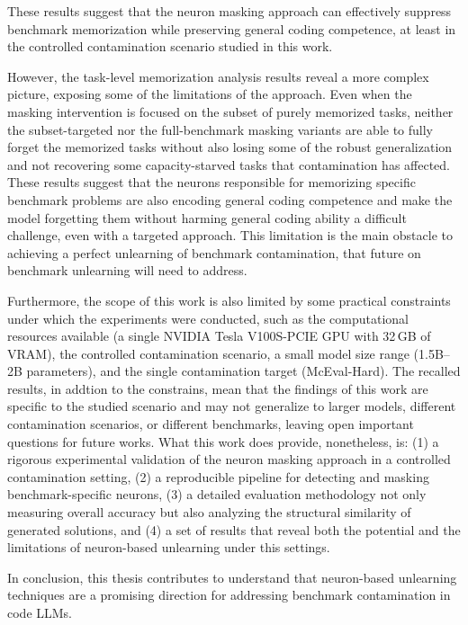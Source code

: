 \documentclass[mscthesis]{usiinfthesis}
\begin{document}
These results suggest that the neuron masking approach can effectively suppress benchmark memorization while preserving general coding competence, at least in the controlled contamination scenario studied in this work.
\par\vspace{1em}
However, the task-level memorization analysis results reveal a more complex picture, exposing some of the limitations of the approach.
Even when the masking intervention is focused on the subset of purely memorized tasks, neither the subset-targeted nor the full-benchmark masking variants are able to fully forget the memorized tasks without also losing some of the robust generalization and not recovering some capacity-starved tasks that contamination has affected.
These results suggest that the neurons responsible for memorizing specific benchmark problems are also encoding general coding competence and make the model forgetting them without harming general coding ability a difficult challenge, even with a targeted approach.
This limitation is the main obstacle to achieving a perfect unlearning of benchmark contamination, that future on benchmark unlearning will need to address.
\par\vspace{1em}
Furthermore, the scope of this work is also limited by some practical constraints under which the experiments were conducted, such as the computational resources available (a single NVIDIA Tesla V100S-PCIE GPU with 32\,GB of VRAM), the controlled contamination scenario, a small model size range (1.5B--2B parameters), and the single contamination target (McEval-Hard).
The recalled results, in addtion to the constrains, mean that the findings of this work are specific to the studied scenario and may not generalize to larger models, different contamination scenarios, or different benchmarks, leaving open important questions for future works.
What this work does provide, nonetheless, is: (1) a rigorous experimental validation of the neuron masking approach in a controlled contamination setting, (2) a reproducible pipeline for detecting and masking benchmark-specific neurons, (3) a detailed evaluation methodology not only measuring overall accuracy but also analyzing the structural similarity of generated solutions, and (4) a set of results that reveal both the potential and the limitations of neuron-based unlearning under this settings.
\par\vspace{1em}
In conclusion, this thesis contributes to understand that neuron-based unlearning techniques are a promising direction for addressing benchmark contamination in code LLMs.
\end{document}
